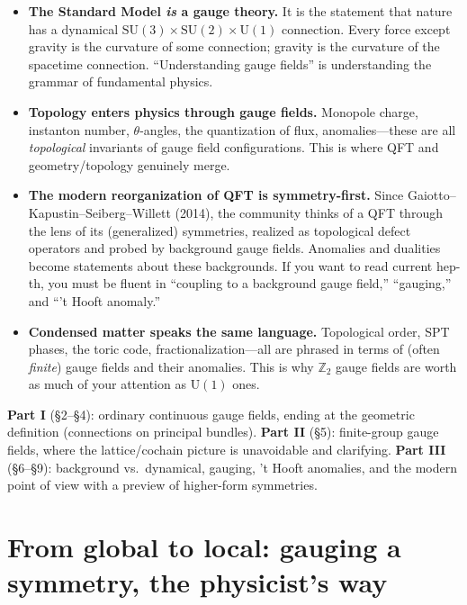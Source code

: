 \documentclass[11pt]{article}
\newcommand{\Uone}{\mathrm{U}(1)}
\newcommand{\Ztwo}{\mathbb{Z}_2}
\begin{document}
\begin{itemize}
\item \textbf{The Standard Model \emph{is} a gauge theory.} It is the statement that
nature has a dynamical $\mathrm{SU}(3)\times\mathrm{SU}(2)\times\Uone$ connection.
Every force except gravity is the curvature of some connection; gravity is the
curvature of the spacetime connection. ``Understanding gauge fields'' is understanding
the grammar of fundamental physics.
\item \textbf{Topology enters physics through gauge fields.} Monopole charge,
instanton number, $\theta$-angles, the quantization of flux, anomalies---these are all
\emph{topological} invariants of gauge field configurations. This is where QFT and
geometry/topology genuinely merge.
\item \textbf{The modern reorganization of QFT is symmetry-first.} Since
Gaiotto--Kapustin--Seiberg--Willett (2014), the community thinks of a QFT through the
lens of its (generalized) symmetries, realized as topological defect operators and
probed by background gauge fields. Anomalies and dualities become statements about
these backgrounds. If you want to read current hep-th, you must be fluent in
``coupling to a background gauge field,'' ``gauging,'' and ``'t Hooft anomaly.''
\item \textbf{Condensed matter speaks the same language.} Topological order, SPT
phases, the toric code, fractionalization---all are phrased in terms of (often
\emph{finite}) gauge fields and their anomalies. This is why $\Ztwo$ gauge fields are
worth as much of your attention as $\Uone$ ones.
\end{itemize}

\begin{nnote}
\textbf{Part I} (\S2--\S4): ordinary continuous gauge fields, ending at the geometric
definition (connections on principal bundles). \textbf{Part II} (\S5): finite-group
gauge fields, where the lattice/cochain picture is unavoidable and clarifying.
\textbf{Part III} (\S6--\S9): background vs.\ dynamical, gauging, 't Hooft anomalies,
and the modern point of view with a preview of higher-form symmetries.
\end{nnote}

\section{From global to local: gauging a symmetry, the physicist's way}
\end{document}
